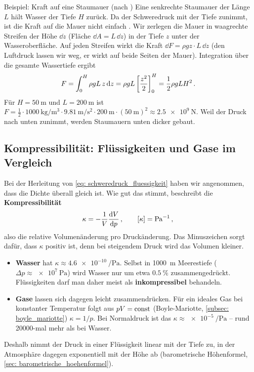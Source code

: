 \begin{examplebox}[]{Beispiel: Kraft auf eine Staumauer (nach \cite[S.~167]{Demtroeder2018})}
    Eine senkrechte Staumauer der Länge $L$ hält Wasser der Tiefe $H$ zurück. Da der Schweredruck mit der Tiefe zunimmt, ist die Kraft auf die Mauer nicht einfach . Wir zerlegen die Mauer in waagrechte Streifen der Höhe $\dd z$ (Fläche $\dd A = L\,\dd z$) in der Tiefe $z$ unter der Wasseroberfläche. Auf jeden Streifen wirkt die Kraft $\dd F = \rho g z \cdot L \, \dd z$ (den Luftdruck lassen wir weg, er wirkt auf beide Seiten der Mauer). Integration über die gesamte Wassertiefe ergibt
    \begin{equation*}
        F = \int_0^H \rho g L \, z \, \mathrm{d} z = \rho g L \left[\frac{z^2}{2}\right]_0^H = \frac{1}{2} \rho g L H^2 \,.
    \end{equation*}
    Für $H = \SI{50}{\meter}$ und $L = \SI{200}{\meter}$ ist $F = \frac{1}{2} \cdot \SI{1000}{\kilogram\per\meter\cubed} \cdot \SI{9.81}{\meter\per\second\squared} \cdot \SI{200}{\meter} \cdot (\SI{50}{\meter})^2 \approx \SI{2.5e9}{\newton}$. Weil der Druck nach unten zunimmt, werden Staumauern unten dicker gebaut.
\end{examplebox}

\subsection{Kompressibilität: Flüssigkeiten und Gase im Vergleich}\label{subsec: kompressibilitaet}
Bei der Herleitung von \cref{eq: schweredruck_fluessigkeit} haben wir angenommen, dass die Dichte überall gleich ist. Wie gut das stimmt, beschreibt die \textbf{Kompressibilität}
\begin{equation}\label{eq: kompressibilitaet}
    \kappa = -\frac{1}{V} \frac{\mathrm{d} V}{\mathrm{d} p} \,{,}\, \qquad [\kappa] = \si{\per\pascal} \,{,}\,
\end{equation}
also die relative Volumenänderung pro Druckänderung. Das Minuszeichen sorgt dafür, dass $\kappa$ positiv ist, denn bei steigendem Druck wird das Volumen kleiner.
\begin{itemize}[itemsep=1.5pt]
    \item \textbf{Wasser} hat $\kappa \approx \SI{4.6e-10}{\per\pascal}$. Selbst in \SI{1000}{\meter} Meerestiefe ($\Delta p \approx \SI{e7}{\pascal}$) wird Wasser nur um etwa $\SI{0.5}{\percent}$ zusammengedrückt. Flüssigkeiten darf man daher meist als \textbf{inkompressibel} behandeln.
    \item \textbf{Gase} lassen sich dagegen leicht zusammendrücken. Für ein ideales Gas bei konstanter Temperatur folgt aus $p V = \mathrm{const}$ (Boyle-Mariotte, \cref{subsec: boyle_mariotte}) $\kappa = 1/p$. Bei Normaldruck ist das $\kappa \approx \SI{e-5}{\per\pascal}$ -- rund \num{20000}-mal mehr als bei Wasser.
\end{itemize}
Deshalb nimmt der Druck in einer Flüssigkeit linear mit der Tiefe zu, in der Atmosphäre dagegen exponentiell mit der Höhe ab (barometrische Höhenformel, \cref{sec: barometrische_hoehenformel}).

